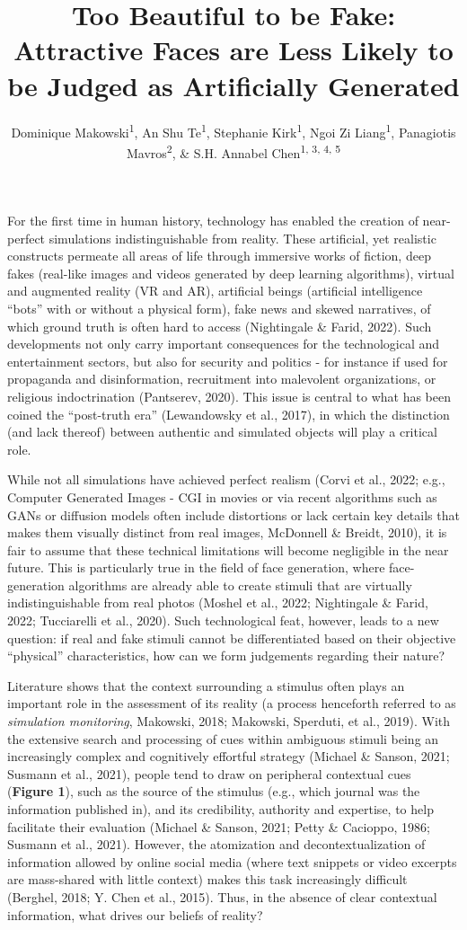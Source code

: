 \documentclass[
  man,floatsintext]{apa6}
\title{\textbf{Too Beautiful to be Fake: Attractive Faces are Less Likely to be Judged as Artificially Generated}}
\author{Dominique Makowski\textsuperscript{1}, An Shu Te\textsuperscript{1}, Stephanie Kirk\textsuperscript{1}, Ngoi Zi Liang\textsuperscript{1}, Panagiotis Mavros\textsuperscript{2}, \& S.H. Annabel Chen\textsuperscript{1, 3, 4, 5}}
\date{}
\affiliation{\vspace{0.5cm}\textsuperscript{1} School of Social Sciences, Nanyang Technological University, Singapore\\\textsuperscript{2} Singapore-ETH Centre, Future Cities Laboratory, Singapore\\\textsuperscript{3} LKC Medicine, Nanyang Technological University, Singapore\\\textsuperscript{4} National Institute of Education, Singapore\\\textsuperscript{5} Centre for Research and Development in Learning, Nanyang Technological University, Singapore}
\begin{document}
\maketitle

For the first time in human history, technology has enabled the creation of near-perfect simulations indistinguishable from reality. These artificial, yet realistic constructs permeate all areas of life through immersive works of fiction, deep fakes (real-like images and videos generated by deep learning algorithms), virtual and augmented reality (VR and AR), artificial beings (artificial intelligence ``bots'' with or without a physical form), fake news and skewed narratives, of which ground truth is often hard to access (Nightingale \& Farid, 2022). Such developments not only carry important consequences for the technological and entertainment sectors, but also for security and politics - for instance if used for propaganda and disinformation, recruitment into malevolent organizations, or religious indoctrination (Pantserev, 2020). This issue is central to what has been coined the ``post-truth era'' (Lewandowsky et al., 2017), in which the distinction (and lack thereof) between authentic and simulated objects will play a critical role.

While not all simulations have achieved perfect realism (Corvi et al., 2022; e.g., Computer Generated Images - CGI in movies or via recent algorithms such as GANs or diffusion models often include distortions or lack certain key details that makes them visually distinct from real images, McDonnell \& Breidt, 2010), it is fair to assume that these technical limitations will become negligible in the near future. This is particularly true in the field of face generation, where face-generation algorithms are already able to create stimuli that are virtually indistinguishable from real photos (Moshel et al., 2022; Nightingale \& Farid, 2022; Tucciarelli et al., 2020). Such technological feat, however, leads to a new question: if real and fake stimuli cannot be differentiated based on their objective ``physical'' characteristics, how can we form judgements regarding their nature?

Literature shows that the context surrounding a stimulus often plays an important role in the assessment of its reality (a process henceforth referred to as \emph{simulation monitoring}, Makowski, 2018; Makowski, Sperduti, et al., 2019). With the extensive search and processing of cues within ambiguous stimuli being an increasingly complex and cognitively effortful strategy (Michael \& Sanson, 2021; Susmann et al., 2021), people tend to draw on peripheral contextual cues (\textbf{Figure 1}), such as the source of the stimulus (e.g., which journal was the information published in), and its credibility, authority and expertise, to help facilitate their evaluation (Michael \& Sanson, 2021; Petty \& Cacioppo, 1986; Susmann et al., 2021). However, the atomization and decontextualization of information allowed by online social media (where text snippets or video excerpts are mass-shared with little context) makes this task increasingly difficult (Berghel, 2018; Y. Chen et al., 2015). Thus, in the absence of clear contextual information, what drives our beliefs of reality?
\end{document}
